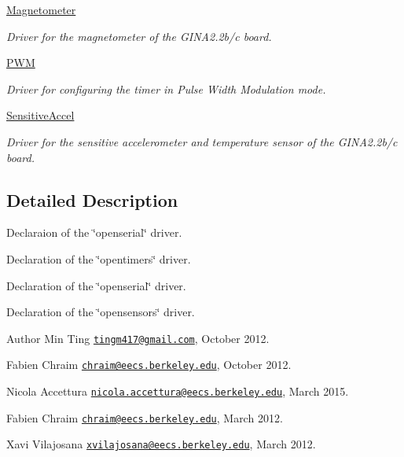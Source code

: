 \begin{DoxyCompactItemize}
\hyperlink{group___magnetometer}{Magnetometer}
\begin{DoxyCompactList}\small\item\em Driver for the magnetometer of the G\+I\+N\+A2.\+2b/c board. \end{DoxyCompactList}\item 
\hyperlink{group___p_w_m}{P\+WM}
\begin{DoxyCompactList}\small\item\em Driver for configuring the timer in Pulse Width Modulation mode. \end{DoxyCompactList}\item 
\hyperlink{group___sensitive_accel}{Sensitive\+Accel}
\begin{DoxyCompactList}\small\item\em Driver for the sensitive accelerometer and temperature sensor of the G\+I\+N\+A2.\+2b/c board. \end{DoxyCompactList}\end{DoxyCompactItemize}


\subsection{Detailed Description}
Declaraion of the \char`\"{}openserial\char`\"{} driver. 

Declaration of the \char`\"{}opentimers\char`\"{} driver.

Declaration of the \char`\"{}openserial\char`\"{} driver.

Declaration of the \char`\"{}opensensors\char`\"{} driver.

\begin{DoxyAuthor}{Author}
Min Ting \href{mailto:tingm417@gmail.com}{\tt tingm417@gmail.\+com}, October 2012. 

Fabien Chraim \href{mailto:chraim@eecs.berkeley.edu}{\tt chraim@eecs.\+berkeley.\+edu}, October 2012.

Nicola Accettura \href{mailto:nicola.accettura@eecs.berkeley.edu}{\tt nicola.\+accettura@eecs.\+berkeley.\+edu}, March 2015.

Fabien Chraim \href{mailto:chraim@eecs.berkeley.edu}{\tt chraim@eecs.\+berkeley.\+edu}, March 2012.

Xavi Vilajosana \href{mailto:xvilajosana@eecs.berkeley.edu}{\tt xvilajosana@eecs.\+berkeley.\+edu}, March 2012. 
\end{DoxyAuthor}
